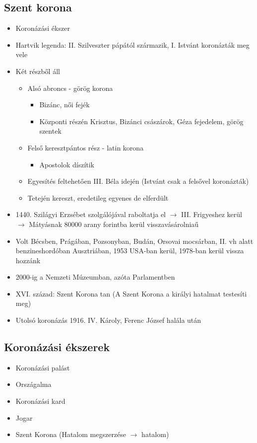 \documentclass{article}
\begin{document}
\subsection{Szent korona}
\begin{itemize}
    \item Koronázási ékszer
    \item Hartvik legenda: II. Szilveszter pápától származik, I. Istvánt koronázták meg vele
    \item Két részből áll 
    \begin{itemize}
        \item Alsó abroncs - görög korona 
        \begin{itemize}
            \item Bizánc, női fejék
            \item Központi részén Krisztus, Bizánci császárok, Géza fejedelem, görög szentek
        \end{itemize}
        
        \item Felső keresztpántos rész - latin korona 
        \begin{itemize}
            \item Apostolok díszítik
        \end{itemize}
        
        \item Egyesítés feltehetően III. Béla idején (Istvánt csak a felsővel koronázták)
        \item Tetején kereszt, eredetileg egyenes de elferdült
    \end{itemize}
    
    \item 1440. Szilágyi Erzsébet szolgálójával raboltatja el $\rightarrow$ III. Frigyeshez kerül $\rightarrow$ Mátyásnak $80000$ arany forintba kerül visszavásárolniaű
    
    \item Volt Bécsben, Prágában, Pozsonyban, Budán, Orsovai mocsárban, II. vh alatt benzineshordóban Ausztriában, 1953 USA-ban kerül, 1978-ban kerül vissza hozzánk 
    
    \item 2000-ig a Nemzeti Múzeumban, azóta Parlamentben

    \item XVI. század: Szent Korona tan (A Szent Korona a királyi hatalmat testesíti meg)

    \item Utolsó koronázás 1916. IV. Károly, Ferenc József halála után

\end{itemize}

\subsection{Koronázási ékszerek}
\begin{itemize}
    \item Koronázási palást
    \item Országalma
    \item Koronázási kard
    \item Jogar
    \item Szent Korona (Hatalom megszerzése $\rightarrow$ hatalom)
\end{itemize}
\end{document}
